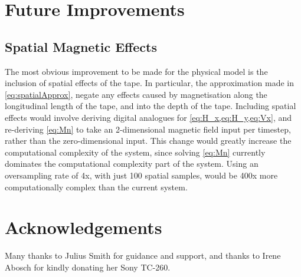\documentclass[twoside,a4paper]{article}
\begin{document}
\section{Future Improvements}
\subsection{Spatial Magnetic Effects}
The most obvious improvement to be made for the physical model
is the inclusion of spatial effects of the tape. In particular,
the approximation made in \cref{eq:spatialApprox}, negate any
effects caused by magnetisation along the longitudinal length
of the tape, and into the depth of the tape. Including spatial
effects would involve deriving digital analogues for
\cref{eq:H_x,eq:H_y,eq:Vx}, and re-deriving \cref{eq:Mn}
to take an 2-dimensional magnetic field input per timestep,
rather than the zero-dimensional input. This change
would greatly increase the computational complexity of the system,
since solving \cref{eq:Mn} currently dominates the computational
complexity part of the system. Using an oversampling rate of 4x,
with just 100 spatial samples, would be 400x more
computationally complex than the current system.

\section{Acknowledgements}
Many thanks to Julius Smith for guidance and support, and
thanks to Irene Abosch for kindly donating her Sony TC-260.

\nocite{*}


\end{document}
